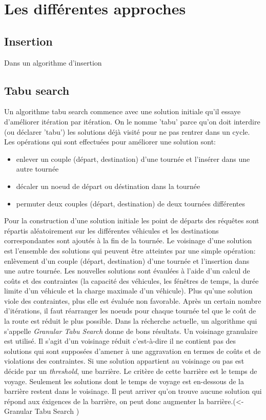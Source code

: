 \documentclass[10pt,a4paper]{report}
\begin{document}
\section*{Les différentes approches}

\subsection*{Insertion}
Dans un algorithme d'insertion 
\subsection*{Tabu search}
Un algorithme tabu search commence avec une solution initiale qu'il essaye d'améliorer itération par itération. On le nomme 'tabu' parce qu'on doit interdire (ou déclarer 'tabu') les solutions déjà visité pour ne pas rentrer dans un cycle. Les opérations qui sont effectuées pour améliorer une solution sont:
\begin{itemize}
\item enlever un couple (départ, destination) d'une tournée et l'insérer dans une autre tournée
\item décaler un noeud de départ ou déstination dans la tournée
\item permuter deux couples (départ, destination) de deux tournées différentes
\end{itemize}
Pour la construction d'une solution initiale les point de départs des réquêtes sont répartis aléatoirement sur les différentes véhicules et les destinations correspondantes sont ajoutés à la fin de la tournée. Le voisinage d'une solution est l'ensemble des solutions qui peuvent être atteintes par une simple opération: enlèvement d'un couple (départ, destination) d'une tournée et l'insertion dans une autre tournée. Les nouvelles solutions sont évaulées à l'aide d'un calcul de coûts et des contraintes (la capacité des véhicules, les fénêtres de temps, la durée limite d'un véhicule et la charge maximale d'un véhicule). Plus qu'une solution viole des contraintes, plus elle est évaluée non favorable. Après un certain nombre d'itérations, il faut réarranger les noeuds pour chaque tournée tel que le coût de la route est réduit le plus possible. 
\newline
Dans la récherche actuelle, un algorithme qui s'appelle \textit{Granular Tabu Search} donne de bons résultats. Un voisinage granulaire est utilisé. Il s'agit d'un voisinage réduit c'est-à-dire il ne contient pas des solutions qui sont supposées d'amener à une aggravation en termes de coûts et de violations des contraintes. Si une solution appartient au voisinage ou pas est décide par un \textit{threshold}, une barrière. Le critère de cette barrière est le temps de voyage. Seulement les solutions dont le temps de voyage est en-dessous de la barrière restent dans le voisinage. Il peut arriver qu'on trouve aucune solution qui répond aux éxigences de la barrière, on peut donc augmenter la barrière.(<- Granular Tabu Search )
\end{document}
